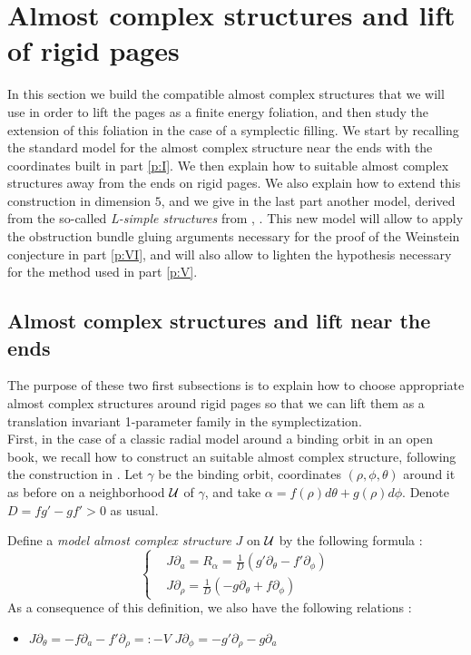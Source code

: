 \documentclass[../main.tex]{subfiles}
\begin{document}
\section{Almost complex structures and lift of rigid pages}\label{p:II}

In this section we build the compatible almost complex structures that we will use in order to lift the pages as a finite energy foliation, and then study the extension of this foliation in the case of a symplectic filling. We start by recalling the standard model for the almost complex structure near the ends with the coordinates built in part \ref{p:I}. We then explain how to suitable almost complex structures away from the ends on rigid pages. We also explain how to extend this construction in dimension $5$, and we give in the last part another model, derived from the so-called \textit{L-simple structures} from \cite{bao_definition_2018}, \cite{bao_semi-global_2023}. This new model will allow to apply the obstruction bundle gluing arguments necessary for the proof of the Weinstein conjecture in part \ref{p:VI}, and will also allow to lighten the hypothesis necessary for the method used in part \ref{p:V}. 

\subsection{Almost complex structures and lift near the ends}

The purpose of these two first subsections is to explain how to choose appropriate almost complex structures around rigid pages so that we can lift them as a translation invariant 1-parameter family in the symplectization. \\

First, in the case of a classic radial model around a binding orbit in an open book, we recall how to construct an suitable almost complex structure, following the construction in \cite{wendl_open_2009}. Let $\gamma$ be the binding orbit, coordinates $(\rho,\phi,\theta)$ around it as before on a neighborhood $\mathcal{U}$ of $\gamma$, and take $\alpha = f(\rho)d\theta + g(\rho)d\phi$. Denote $D = fg' - gf' > 0$ as usual.\\

\begin{definition}\label{d:exact_acs}
Define a \textit{model almost complex structure} $J$ on $\mathcal{U}$ by the following formula : 
\begin{equation}
\left\{
    \begin{array}{ll}
        & J\partial_a = R_\alpha = \frac{1}{D}(g'\partial_\theta - f'\partial_\phi) \\
        & J\partial_\rho = \frac{1}{D}(-g\partial_\theta + f\partial_\phi) 
    \end{array}
\right.
\end{equation}
As a consequence of this definition, we also have the following relations : 
\begin{itemize}
    \item $J\partial_\theta = -f\partial_a - f'\partial_\rho =: -V$                       \inlineitem $J\partial_\phi = -g'\partial_\rho -g\partial_a$
\end{itemize}
\end{definition}
\end{document}
